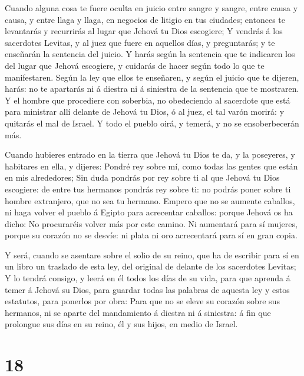 Cuando alguna cosa te fuere oculta en juicio entre sangre y
sangre, entre causa y causa, y entre llaga y llaga, en negocios de
litigio en tus ciudades; entonces te levantarás y recurrirás al lugar
que Jehová tu Dios escogiere;  Y vendrás á los sacerdotes
Levitas, y al juez que fuere en aquellos días, y preguntarás; y te
enseñarán la sentencia del juicio.  Y harás según la
sentencia que te indicaren los del lugar que Jehová escogiere, y
cuidarás de hacer según todo lo que te manifestaren.  Según
la ley que ellos te enseñaren, y según el juicio que te dijeren, harás:
no te apartarás ni á diestra ni á siniestra de la sentencia que te
mostraren.  Y el hombre que procediere con soberbia, no
obedeciendo al sacerdote que está para ministrar allí delante de Jehová
tu Dios, ó al juez, el tal varón morirá: y quitarás el mal de Israel.
 Y todo el pueblo oirá, y temerá, y no se ensoberbecerán
más.

 Cuando hubieres entrado en la tierra que Jehová tu Dios te
da, y la poseyeres, y habitares en ella, y dijeres: Pondré rey sobre mí,
como todas las gentes que están en mis alrededores;  Sin
duda pondrás por rey sobre ti al que Jehová tu Dios escogiere: de entre
tus hermanos pondrás rey sobre ti: no podrás poner sobre ti hombre
extranjero, que no sea tu hermano.  Empero que no se
aumente caballos, ni haga volver el pueblo á Egipto para acrecentar
caballos: porque Jehová os ha dicho: No procuraréis volver más por este
camino.  Ni aumentará para sí mujeres, porque su corazón no
se desvíe: ni plata ni oro acrecentará para sí en gran copia.

 Y será, cuando se asentare sobre el solio de su reino, que
ha de escribir para sí en un libro un traslado de esta ley, del original
de delante de los sacerdotes Levitas;  Y lo tendrá consigo,
y leerá en él todos los días de su vida, para que aprenda á temer á
Jehová su Dios, para guardar todas las palabras de aquesta ley y estos
estatutos, para ponerlos por obra:  Para que no se eleve su
corazón sobre sus hermanos, ni se aparte del mandamiento á diestra ni á
siniestra: á fin que prolongue sus días en su reino, él y sus hijos, en
medio de Israel.

\hypertarget{section-17}{%
\section{18}\label{section-17}}

